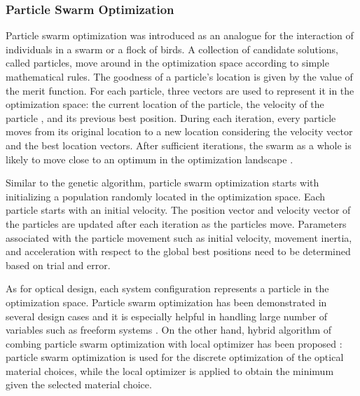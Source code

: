 \subsubsection{Particle Swarm Optimization}
Particle swarm optimization was introduced as an analogue for the interaction of individuals in a swarm or a flock of birds. A collection of candidate solutions, called particles, move around in the optimization space according to simple mathematical rules. The goodness of a particle's location is given by the value of the merit function. For each particle, three vectors are used to represent it in the optimization space: the current location of the particle, the velocity of the particle , and its previous best position. During each iteration, every particle moves from its original location to a new location considering the velocity vector and the best location vectors.  After sufficient iterations, the swarm as a whole is likely to move close to an optimum in the optimization landscape \cite{MenkeParticleSwarm} . 

Similar to the genetic algorithm, particle swarm optimization starts with initializing a population randomly located in the optimization space. Each particle starts with an initial velocity. The position vector and velocity vector of the particles are updated after each iteration as the particles move. Parameters associated with the particle movement such as initial velocity, movement inertia, and acceleration with respect to the global best positions need to be determined based on trial and error. 

As for optical design, each system configuration represents a particle in the optimization space. Particle swarm optimization has been demonstrated in several design cases and it is especially helpful in handling large number of variables such as freeform systems \cite{MenkeParticleSwarm}. On the other hand, hybrid algorithm of combing particle swarm optimization with local optimizer has been proposed \cite{Guo:sParticleSwarm}: particle swarm optimization is used for the discrete optimization of the optical material choices, while the local optimizer is applied to obtain the minimum given the selected material choice.  

